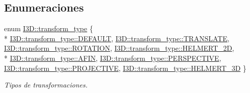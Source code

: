 \subsection*{Enumeraciones}
\begin{DoxyCompactItemize}
\item 
enum \hyperlink{group__trf_group_ga175e1580b1ecbc0710ad48060d56c2a3}{I3\+D\+::transform\+\_\+type} \{ \\*
\hyperlink{group__trf_group_gga175e1580b1ecbc0710ad48060d56c2a3a5b39c8b553c821e7cddc6da64b5bd2ee}{I3\+D\+::transform\+\_\+type\+::\+D\+E\+F\+A\+U\+LT}, 
\hyperlink{group__trf_group_gga175e1580b1ecbc0710ad48060d56c2a3a6ba95f0374a24124cc1632dc38333c82}{I3\+D\+::transform\+\_\+type\+::\+T\+R\+A\+N\+S\+L\+A\+TE}, 
\hyperlink{group__trf_group_gga175e1580b1ecbc0710ad48060d56c2a3aa27939099e0fe4086159364fcf8d5f73}{I3\+D\+::transform\+\_\+type\+::\+R\+O\+T\+A\+T\+I\+ON}, 
\hyperlink{group__trf_group_gga175e1580b1ecbc0710ad48060d56c2a3a451b65c237869c22726d0e7cabe674d7}{I3\+D\+::transform\+\_\+type\+::\+H\+E\+L\+M\+E\+R\+T\+\_\+2D}, 
\\*
\hyperlink{group__trf_group_gga175e1580b1ecbc0710ad48060d56c2a3a11f9aa324c4ce45b5c88e380cccd43dc}{I3\+D\+::transform\+\_\+type\+::\+A\+F\+IN}, 
\hyperlink{group__trf_group_gga175e1580b1ecbc0710ad48060d56c2a3ad46c97be63d6c4cb887419a4a3df5347}{I3\+D\+::transform\+\_\+type\+::\+P\+E\+R\+S\+P\+E\+C\+T\+I\+VE}, 
\hyperlink{group__trf_group_gga175e1580b1ecbc0710ad48060d56c2a3a852f7bd2984c084e69c284da9279df7b}{I3\+D\+::transform\+\_\+type\+::\+P\+R\+O\+J\+E\+C\+T\+I\+VE}, 
\hyperlink{group__trf_group_gga175e1580b1ecbc0710ad48060d56c2a3a984738e72c54b69efbf714641982b3fc}{I3\+D\+::transform\+\_\+type\+::\+H\+E\+L\+M\+E\+R\+T\+\_\+3D}
 \}\begin{DoxyCompactList}\small\item\em Tipos de transformaciones. \end{DoxyCompactList}
\end{DoxyCompactItemize}
